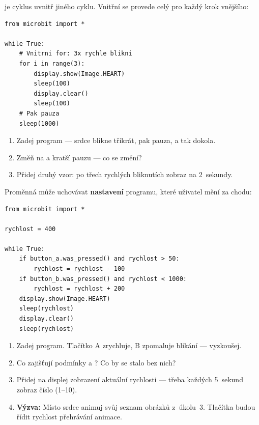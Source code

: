 \begin{bonusukol}

 je cyklus uvnitř jiného cyklu.
Vnitřní se provede celý pro každý krok vnějšího:

\begin{lstlisting}
from microbit import *

while True:
    # Vnitrni for: 3x rychle blikni
    for i in range(3):
        display.show(Image.HEART)
        sleep(100)
        display.clear()
        sleep(100)
    # Pak pauza
    sleep(1000)
\end{lstlisting}

\begin{enumerate}
  \item Zadej program — srdce blikne třikrát, pak pauza, a tak dokola.
  \item Změň  na  a kratší pauzu — co se změní?
  \item Přidej druhý vzor: po třech rychlých bliknutích zobraz
         na 2~sekundy.
\end{enumerate}

\odpoved[2cm]

\end{bonusukol}

\begin{bonusukol}

Proměnná může uchovávat \textbf{nastavení} programu, které uživatel mění za chodu:

\begin{lstlisting}
from microbit import *

rychlost = 400

while True:
    if button_a.was_pressed() and rychlost > 50:
        rychlost = rychlost - 100
    if button_b.was_pressed() and rychlost < 1000:
        rychlost = rychlost + 200
    display.show(Image.HEART)
    sleep(rychlost)
    display.clear()
    sleep(rychlost)
\end{lstlisting}

\begin{enumerate}
  \item Zadej program. Tlačítko A zrychluje, B zpomaluje blikání — vyzkoušej.
  \item Co zajišťují podmínky  a ?
        Co by se stalo bez nich?
  \item Přidej na displej zobrazení aktuální rychlosti — třeba každých 5~sekund
        zobraz číslo  (1–10).
  \item \textbf{Výzva:} Místo srdce animuj svůj seznam obrázků z~úkolu~3.
        Tlačítka budou řídit rychlost přehrávání animace.
\end{enumerate}

\odpoved[3cm]

\end{bonusukol}


